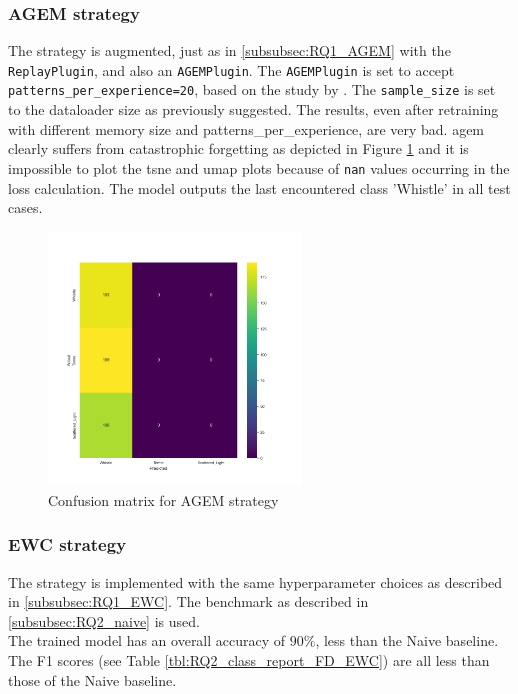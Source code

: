 \subsubsection{AGEM strategy}
\label{subsubsec:RQ2_agem}
The strategy is augmented, just as in \ref{subsubsec:RQ1_AGEM} with the \verb|ReplayPlugin|, and also an \verb|AGEMPlugin|. The \verb|AGEMPlugin| is set to accept \verb|patterns_per_experience=20|, based on the study by \citep{chaudhry2019continual}. 
The \verb|sample_size| is set to the dataloader size as previously suggested. 
The results, even after retraining with different memory size and patterns\_per\_experience, are very bad. \acrshort{agem} clearly suffers from catastrophic forgetting as depicted in Figure \ref{fig:cm_FD_agem} and it is impossible to plot the \acrshort{tsne} and \acrshort{umap} plots because of \verb|nan| values occurring in the loss calculation. 
The model outputs the last encountered class 'Whistle' in all test cases. 
\begin{figure}[H]
    \centering
    \includegraphics[width=0.6\textwidth]{Grad Assignment/Images/cm_FD_model_AGEM.png}
    \caption{Confusion matrix for AGEM strategy}
    \label{fig:cm_FD_agem}
\end{figure}


\subsubsection{EWC strategy}
\label{subsubsec:RQ2_ewc}
The strategy is implemented with the same hyperparameter choices as described in \ref{subsubsec:RQ1_EWC}. The benchmark as described in \ref{subsubsec:RQ2_naive} is used. \\
The trained model has an overall accuracy of $90\%$, less than the Naive baseline. The F1 scores (see Table \ref{tbl:RQ2_class_report_FD_EWC}) are all less than those of the Naive baseline. 

